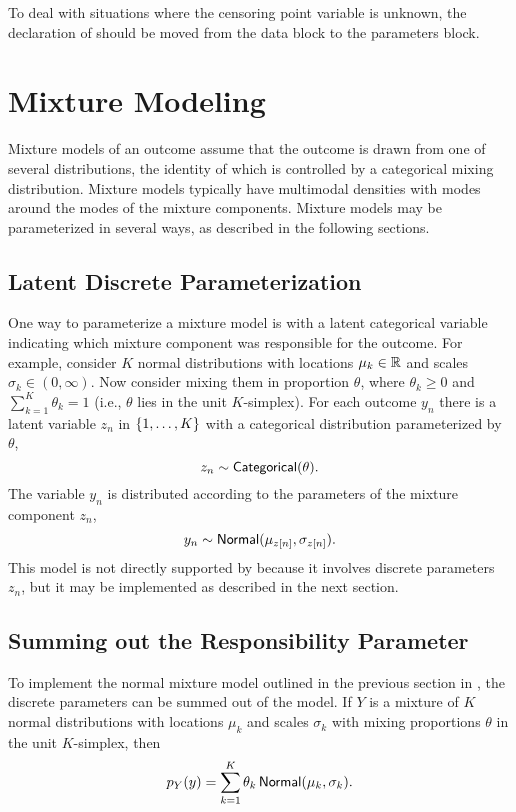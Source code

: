 To deal with situations where the censoring point variable  is
unknown, the declaration of  should be moved from the data
block to the parameters block.



\chapter{Mixture Modeling}\label{mixture-modeling.chapter}

\noindent
Mixture models of an outcome assume that the outcome is drawn from one
of several distributions, the identity of which is controlled by a
categorical mixing distribution. Mixture models typically have
multimodal densities with modes around the modes of the mixture
components.  Mixture models may be parameterized in several ways,
as described in the following sections.


\section{Latent Discrete Parameterization}

One way to parameterize a mixture model is with a latent categorical
variable indicating which mixture component was responsible for the
outcome. For example, consider $K$ normal distributions with locations
$\mu_k \in \mathbb{R}$ and scales $\sigma_k \in (0,\infty)$.  Now consider
mixing them in proportion $\theta$, where $\theta_k \geq 0$ and
$\sum_{k=1}^K \theta_k = 1$ (i.e., $\theta$ lies in the unit $K$-simplex).
For each outcome $y_n$ there is a latent variable $z_n$ in
$\{ 1,\ldots,K \}$ with a categorical distribution parameterized
by $\theta$,
%
\[
z_n \sim \mbox{\sf Categorical}(\theta).
\]
%
The variable $y_n$ is distributed according to the parameters
of the mixture component $z_n$, 
\[
y_n \sim \mbox{\sf Normal}(\mu_{z[n]},\sigma_{z[n]}).
\]
%
This model is not directly supported by \Stan because it involves
discrete parameters $z_n$, but it may be implemented as described in
the next section.

\section{Summing out the Responsibility Parameter}

To implement the normal mixture model outlined in the previous
section in \Stan, the discrete parameters can be summed out of the
model. If $Y$ is a mixture of $K$ normal distributions with 
locations $\mu_k$ and scales $\sigma_k$ with mixing proportions
$\theta$ in the unit $K$-simplex, then 
\[
p_Y(y) = \sum_{k=1}^K \theta_k \, \mbox{\sf Normal}(\mu_k,\sigma_k).
\]

